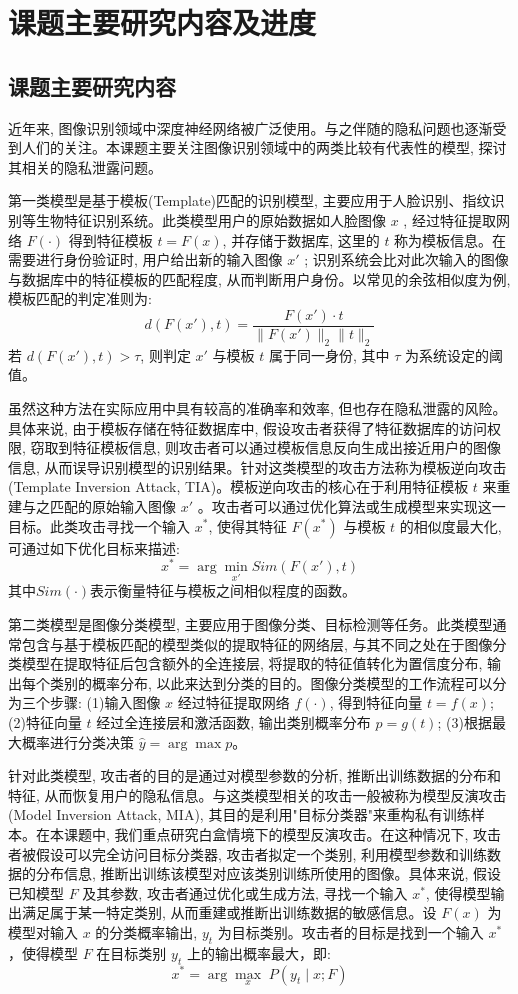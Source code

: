\section{课题主要研究内容及进度}
\subsection{课题主要研究内容}
近年来, 图像识别领域中深度神经网络被广泛使用。与之伴随的隐私问题也逐渐受到人们的关注。本课题主要关注图像识别领域中的两类比较有代表性的模型, 探讨其相关的隐私泄露问题。

第一类模型是基于模板(Template)匹配的识别模型, 主要应用于人脸识别、指纹识别等生物特征识别系统。此类模型用户的原始数据如人脸图像 $x$ , 经过特征提取网络 $F(\cdot)$ 得到特征模板 $t = F(x)$, 并存储于数据库, 这里的 $t$ 称为模板信息。在需要进行身份验证时, 用户给出新的输入图像 $x'$ ; 识别系统会比对此次输入的图像与数据库中的特征模板的匹配程度, 从而判断用户身份。以常见的余弦相似度为例, 模板匹配的判定准则为:
\[
  d(F(x'), t) = \frac{F(x') \cdot t}{\| F(x') \|_2 \| t \|_2}
\]
若 $d(F(x'), t) > \tau$, 则判定 $x'$ 与模板 $t$ 属于同一身份, 其中 $\tau$ 为系统设定的阈值。

虽然这种方法在实际应用中具有较高的准确率和效率, 但也存在隐私泄露的风险。具体来说, 由于模板存储在特征数据库中, 假设攻击者获得了特征数据库的访问权限, 窃取到特征模板信息, 则攻击者可以通过模板信息反向生成出接近用户的图像信息, 从而误导识别模型的识别结果。针对这类模型的攻击方法称为模板逆向攻击(Template Inversion Attack, TIA)。模板逆向攻击的核心在于利用特征模板 $t$ 来重建与之匹配的原始输入图像 $x'$ 。攻击者可以通过优化算法或生成模型来实现这一目标。此类攻击寻找一个输入 $x^*$, 使得其特征 $F(x^*)$ 与模板 $t$ 的相似度最大化, 可通过如下优化目标来描述:
$$x^* = \arg\min_{x'}Sim(F(x'), t)$$
其中$Sim(\cdot)$表示衡量特征与模板之间相似程度的函数。


第二类模型是图像分类模型, 主要应用于图像分类、目标检测等任务。此类模型通常包含与基于模板匹配的模型类似的提取特征的网络层, 与其不同之处在于图像分类模型在提取特征后包含额外的全连接层, 将提取的特征值转化为置信度分布, 输出每个类别的概率分布, 以此来达到分类的目的。图像分类模型的工作流程可以分为三个步骤: (1)输入图像 $x$ 经过特征提取网络 $f(\cdot)$, 得到特征向量 $t = f(x)$; (2)特征向量 $t$ 经过全连接层和激活函数, 输出类别概率分布 $p = g(t)$; (3)根据最大概率进行分类决策 $\hat{y} = \arg\max p$。

针对此类模型, 攻击者的目的是通过对模型参数的分析, 推断出训练数据的分布和特征, 从而恢复用户的隐私信息。与这类模型相关的攻击一般被称为模型反演攻击(Model Inversion Attack, MIA), 其目的是利用"目标分类器"来重构私有训练样本。在本课题中, 我们重点研究白盒情境下的模型反演攻击。在这种情况下, 攻击者被假设可以完全访问目标分类器, 攻击者拟定一个类别, 利用模型参数和训练数据的分布信息, 推断出训练该模型对应该类别训练所使用的图像。具体来说, 假设已知模型 $F$ 及其参数, 攻击者通过优化或生成方法, 寻找一个输入 $x^*$, 使得模型输出满足属于某一特定类别, 从而重建或推断出训练数据的敏感信息。设 $F(x)$ 为模型对输入 $x$ 的分类概率输出, $y_{t}$ 为目标类别。攻击者的目标是找到一个输入 $x^*$，使得模型 $F$ 在目标类别 $y_t$ 上的输出概率最大，即:
$$x^* = \arg\max_{x} \; P(y_t \mid x; F)$$


